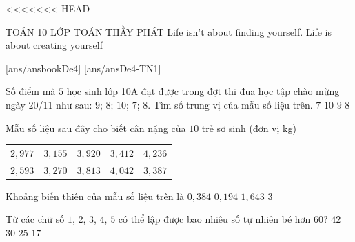 <<<<<<< HEAD
\begin{name}
	{\tenchude}
	{TOÁN 10}
	{LỚP TOÁN THẦY PHÁT}
	{Life isn’t about finding yourself. Life is about creating yourself}
\end{name}
[ans/ansbookDe4]
\TN
{}[ans/ansDe4-TN1]
\begin{ex}%
Số điểm mà $5$ học sinh lớp 10A đạt được trong đợt thi đua học tập chào mừng ngày 20/11 như sau: $9$; $8$; $10$; $7$; $8$. Tìm số trung vị của mẫu số liệu trên.
\choice
{$7$}
{$10$}
{$9$}
{\True $8$}
\end{ex}

\begin{ex}%
Mẫu số liệu sau đây cho biết cân nặng của $10$ trẻ sơ sinh (đơn vị kg)
\begin{center}
\begin{tabular}{ccccc}
$2{,}977$ & $3{,}155$ & $3{,}920$ & $3{,}412$ & $4{,}236$  \\
$2{,}593$&	$3{,}270$ & $3{,}813$ & $4{,}042$ & $3{,}387$      \\
\end{tabular}
\end{center}
Khoảng biến thiên của mẫu số liệu trên là
\choice
{$0{,}384$}
{$0{,}194$}
{\True $1{,}643$}
{$3$}
\end{ex}

\begin{ex}%
Từ các chữ số $1$, $2$, $3$, $4$, $5$ có thể lập được bao nhiêu số tự nhiên bé hơn $60$?
\choice
{$42$}
{\True $30$}
{$25$}
{$17$}
\end{ex}

